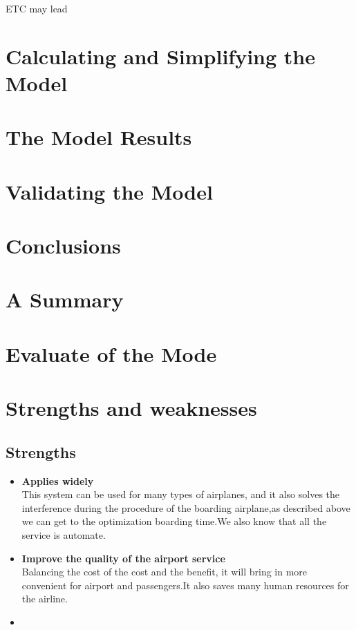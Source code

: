 \documentclass{mcmthesis}
\begin{document}
ETC may lead\cite{spiliopoulou2009toll}

\section{Calculating and Simplifying the Model  }
\lipsum[11]

\section{The Model Results}
\lipsum[6]

\section{Validating the Model}
\lipsum[9]

\section{Conclusions}
\lipsum[6]

\section{A Summary}
\lipsum[6]

\section{Evaluate of the Mode}

\section{Strengths and weaknesses}
\lipsum[12]

\subsection{Strengths}
\begin{itemize}
\item \textbf{Applies widely}\\
This  system can be used for many types of airplanes, and it also
solves the interference during  the procedure of the boarding
airplane,as described above we can get to the  optimization
boarding time.We also know that all the service is automate.
\item \textbf{Improve the quality of the airport service}\\
Balancing the cost of the cost and the benefit, it will bring in
more convenient  for airport and passengers.It also saves many
human resources for the airline. \item \textbf{}
\end{itemize}
\end{document}
